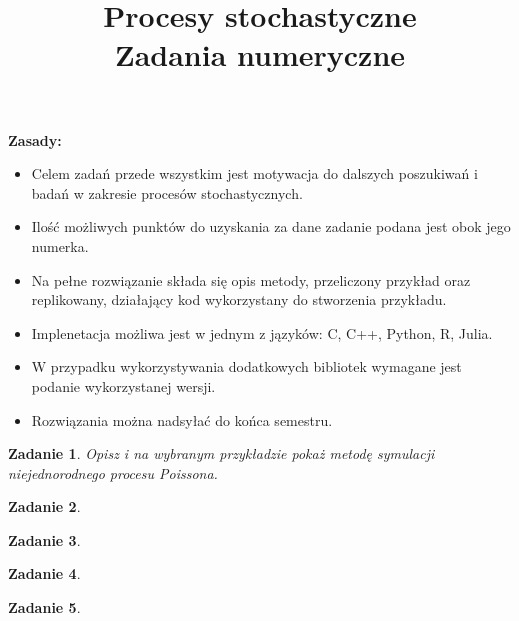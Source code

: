 \documentclass{mwart}
\title{Procesy stochastyczne \\ Zadania numeryczne}
\newtheorem{zd}{Zadanie}
\begin{document}

\maketitle
\textbf{Zasady:}
\begin{itemize}
\item Celem zadań przede wszystkim jest motywacja do dalszych poszukiwań i badań w zakresie procesów stochastycznych.
\item Ilość możliwych punktów do uzyskania za dane zadanie podana jest obok jego numerka.
\item Na pełne rozwiązanie składa się opis metody, przeliczony przykład oraz replikowany, działający kod wykorzystany do stworzenia przykładu.
\item Implenetacja możliwa jest w jednym z jązyków: C, C++, Python, R, Julia.
\item W przypadku wykorzystywania dodatkowych bibliotek wymagane jest podanie wykorzystanej wersji.
\item Rozwiązania można nadsyłać do końca semestru.
\end{itemize}
\begin{zd}
Opisz i na wybranym przykładzie pokaż metodę symulacji niejednorodnego procesu Poissona.
\end{zd}
\begin{zd}

\end{zd}
\begin{zd}

\end{zd}
\begin{zd}

\end{zd}
\begin{zd}

\end{zd}
\begin{thebibliography}{10}

\end{thebibliography}
\end{document}
